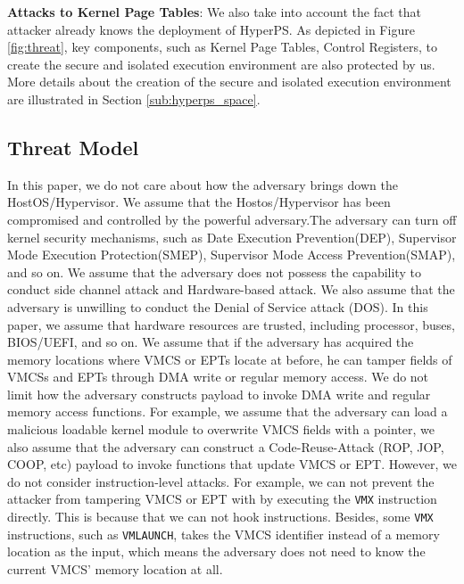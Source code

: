 \textbf{Attacks to Kernel Page Tables}: 
We also take into account the fact that attacker already knows the deployment of HyperPS. As depicted in Figure \ref{fig:threat}, key components, such as Kernel Page Tables, Control Registers, to create the secure and isolated execution environment are also protected by us. More details about the creation of the secure and isolated execution environment are illustrated in Section \ref{sub:hyperps_space}. 
 


\subsection{Threat Model} \label{sub:threatmodel}
In this paper,  we do not care about how the adversary brings down the HostOS/Hypervisor. 
We assume that the Hostos/Hypervisor has been compromised and controlled by the powerful adversary.The adversary can turn off kernel security mechanisms, such as Date Execution Prevention(DEP), Supervisor Mode Execution Protection(SMEP), Supervisor Mode Access Prevention(SMAP), and so on.
We assume that the adversary does not possess the capability to conduct side channel attack and Hardware-based attack. We also assume that the adversary is unwilling to conduct the Denial of Service attack (DOS). In this paper, we assume that hardware resources are trusted, including processor, buses, BIOS/UEFI, and so on. 
We assume that if the adversary has acquired the memory locations where VMCS or EPTs locate at before, he can tamper fields of VMCSs and EPTs through DMA write or regular memory access. 
We do not limit how the adversary constructs payload to invoke DMA write and regular memory access functions. For example, we assume that the adversary can load a malicious loadable kernel module to overwrite VMCS fields with a pointer, we also assume that the adversary can construct a Code-Reuse-Attack (ROP, JOP, COOP, etc) payload to invoke functions that update VMCS or EPT. 
However, we do not consider instruction-level attacks. For example, we can not prevent the attacker from tampering VMCS or EPT with by executing the \verb|VMX| instruction directly. This is because that we can not hook instructions. Besides, some \verb|VMX| instructions, such as \verb|VMLAUNCH|, takes the VMCS identifier instead of a memory location as the input, which means the adversary does not need to know the current VMCS' memory location at all. 

